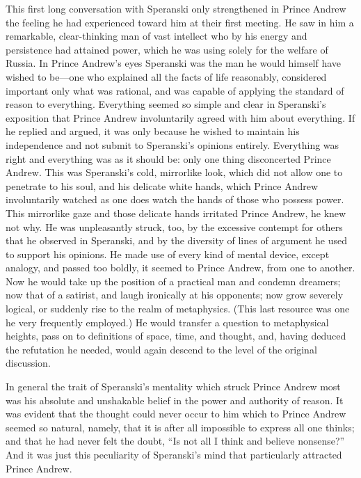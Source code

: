 This first long conversation with Speranski only strengthened in
Prince Andrew the feeling he had experienced toward him at their
first meeting.  He saw in him a remarkable, clear-thinking man of
vast intellect who by his energy and persistence had attained
power, which he was using solely for the welfare of Russia. In
Prince Andrew's eyes Speranski was the man he would himself have
wished to be---one who explained all the facts of life
reasonably, considered important only what was rational, and was
capable of applying the standard of reason to
everything. Everything seemed so simple and clear in Speranski's
exposition that Prince Andrew involuntarily agreed with him about
everything. If he replied and argued, it was only because he
wished to maintain his independence and not submit to Speranski's
opinions entirely. Everything was right and everything was as it
should be: only one thing disconcerted Prince Andrew. This was
Speranski's cold, mirrorlike look, which did not allow one to
penetrate to his soul, and his delicate white hands, which Prince
Andrew involuntarily watched as one does watch the hands of those
who possess power. This mirrorlike gaze and those delicate hands
irritated Prince Andrew, he knew not why. He was unpleasantly
struck, too, by the excessive contempt for others that he
observed in Speranski, and by the diversity of lines of argument
he used to support his opinions. He made use of every kind of
mental device, except analogy, and passed too boldly, it seemed
to Prince Andrew, from one to another. Now he would take up the
position of a practical man and condemn dreamers; now that of a
satirist, and laugh ironically at his opponents; now grow
severely logical, or suddenly rise to the realm of
metaphysics. (This last resource was one he very frequently
employed.) He would transfer a question to metaphysical heights,
pass on to definitions of space, time, and thought, and, having
deduced the refutation he needed, would again descend to the
level of the original discussion.

In general the trait of Speranski's mentality which struck Prince
Andrew most was his absolute and unshakable belief in the power
and authority of reason. It was evident that the thought could
never occur to him which to Prince Andrew seemed so natural,
namely, that it is after all impossible to express all one
thinks; and that he had never felt the doubt, ``Is not all I
think and believe nonsense?'' And it was just this peculiarity of
Speranski's mind that particularly attracted Prince Andrew.

